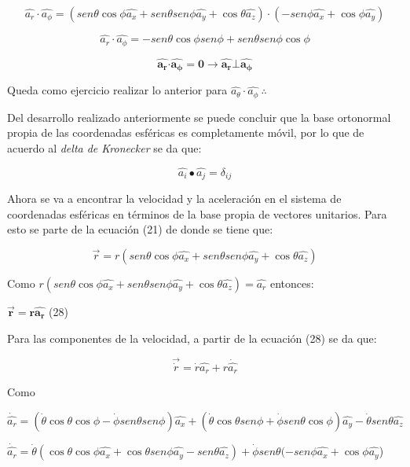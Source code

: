 \documentclass[]{article}
\begin{document}
\[\widehat{a_{r}} \cdot \widehat{a_{\phi}} = \left( {sen}\theta\cos\phi\widehat{a_{x}} + {sen}\theta{sen}\phi\widehat{a_{y}} + \cos\theta\widehat{a_{z}} \right) \cdot ( - {sen}\phi\widehat{a_{x}} + \cos\phi\widehat{a_{y}})\]

\[\widehat{a_{r}} \cdot \widehat{a_{\phi}} = - {sen}\theta\cos\phi{sen}\phi + {sen}\theta{sen}\phi\cos\phi\]

\[\widehat{\mathbf{a}_{\mathbf{r}}}\mathbf{\cdot}\widehat{\mathbf{a}_{\mathbf{\phi}}}\mathbf{= 0 \rightarrow}\widehat{\mathbf{a}_{\mathbf{r}}}\mathbf{\bot}\widehat{\mathbf{a}_{\mathbf{\phi}}}\]

Queda como ejercicio realizar lo anterior para
\(\widehat{a_{\theta}} \cdot \widehat{a_{\phi}}\ \therefore\)

Del desarrollo realizado anteriormente se puede concluir que la base
ortonormal propia de las coordenadas esféricas es completamente móvil,
por lo que de acuerdo al \emph{delta de Kronecker} se da que:

\[\widehat{a_{i}} \bullet \widehat{a_{j}} = \delta_{ij}\]

Ahora se va a encontrar la velocidad y la aceleración en el sistema de
coordenadas esféricas en términos de la base propia de vectores
unitarios. Para esto se parte de la ecuación (21) de donde se tiene que:

\[\overrightarrow{r} = r({sen}\theta\cos\phi\widehat{a_{x}} + {sen}\theta{sen}\phi\widehat{a_{y}} + \cos\theta\widehat{a_{z}})\]

Como
\(r\left( {sen}\theta\cos\phi\widehat{a_{x}} + {sen}\theta{sen}\phi\widehat{a_{y}} + \cos\theta\widehat{a_{z}} \right) = \widehat{a_{r}}\)
entonces:

\(\overrightarrow{\mathbf{r}}\mathbf{=}\mathbf{r}\widehat{\mathbf{a}_{\mathbf{r}}}\)
(28)

Para las componentes de la velocidad, a partir de la ecuación (28) se da
que:

\[\overrightarrow{\dot{r}} = \dot{r}\widehat{a_{r}} + r\dot{\widehat{a_{r}}}\]

Como

\[\dot{\widehat{a_{r}}} = \left( \dot{\theta}\cos\theta\cos\phi - \dot{\phi}{sen}{\theta{sen}\phi} \right)\widehat{a_{x}} + \left( \dot{\theta}\cos\theta{sen}\phi + \dot{\phi}{sen}{\theta\cos\phi} \right)\widehat{a_{y}} - \dot{\theta}{sen}\theta\widehat{a_{z}}\]

\(\dot{\widehat{a_{r}}} = \dot{\theta}\left( \cos\theta\cos\phi\widehat{a_{x}} + \cos\theta{sen}\phi\widehat{a_{y}} - {sen}\theta\widehat{a_{z}} \right) + \dot{\phi}{sen}\theta( - {sen}\phi\widehat{a_{x}} + \cos\phi\widehat{a_{y}}\))
\end{document}
